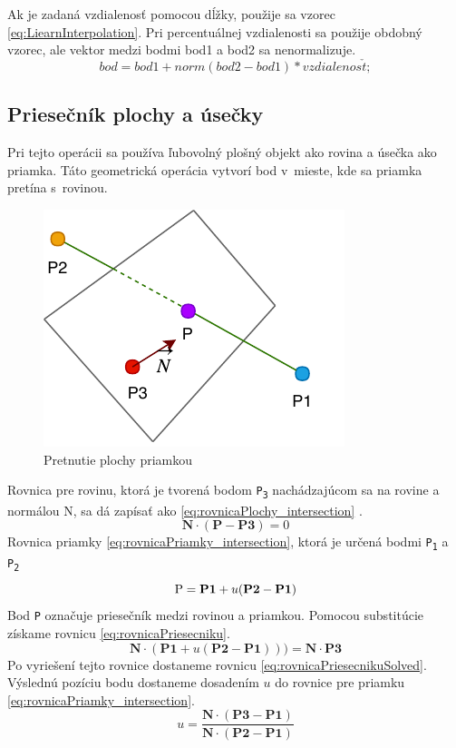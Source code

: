 Ak je zadaná vzdialenosť pomocou dĺžky, použije sa vzorec \ref{eq:LiearnInterpolation}. Pri percentuálnej vzdialenosti sa použije obdobný vzorec, ale vektor medzi bodmi bod1 a bod2 sa nenormalizuje.
\begin{equation}
    bod = bod1 + norm(bod2 - bod1) * vzdialenos\check{t};
	\label{eq:LiearnInterpolation}
\end{equation}


\subsection*{Priesečník plochy a úsečky}

Pri tejto operácii sa používa ľubovolný plošný objekt ako rovina a úsečka ako priamka. Táto geometrická operácia vytvorí bod v~mieste, kde sa priamka pretína s~rovinou. 


\begin{figure}[H]
	\centering
	\includegraphics[height=0.3\textwidth]{obrazky-figures/DP Navrh operacii-Intersection.pdf}
	\caption{Pretnutie plochy priamkou}
	\label{fig:Intersection}
\end{figure}


Rovnica pre rovinu, ktorá je tvorená bodom \texttt{P\textsubscript{3}} nachádzajúcom sa na rovine a normálou N, sa dá zapísať ako \ref{eq:rovnicaPlochy_intersection} \cite{bourke_Point_Line_Plane}. 
\begin{equation}
    \textbf{N} \cdot (\textbf{P} - \textbf{P3}) = 0
	\label{eq:rovnicaPlochy_intersection}
\end{equation}
Rovnica priamky \ref{eq:rovnicaPriamky_intersection}, ktorá je určená bodmi \texttt{P\textsubscript{1}} a \texttt{P\textsubscript{2}}
\begin{equation}
	\textup{P}=\textbf{P1}+u (\textbf{P2}-\textbf{P1})
    \label{eq:rovnicaPriamky_intersection}
\end{equation}
Bod \texttt{P} označuje priesečník medzi rovinou a priamkou. Pomocou substitúcie získame rovnicu \ref{eq:rovnicaPriesecniku}.
\begin{equation}
	\textbf{N} \cdot (\textbf{P1}+u(\textbf{P2}-\textbf{P1}))) = \textbf{N} \cdot \textbf{P3}
    \label{eq:rovnicaPriesecniku}
\end{equation}
Po vyriešení tejto rovnice dostaneme rovnicu \ref{eq:rovnicaPriesecnikuSolved}. Výslednú pozíciu bodu dostaneme dosadením $u$ do rovnice pre  priamku \ref{eq:rovnicaPriamky_intersection}.
\begin{equation}
	u=\frac
{\textbf{N} \cdot (\textbf{P3}-\textbf{P1})}
{\textbf{N} \cdot (\textbf{P2}-\textbf{P1})}
    \label{eq:rovnicaPriesecnikuSolved}
\end{equation}


